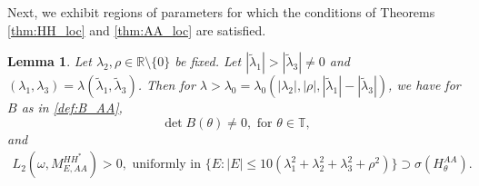 \documentclass[11pt]{amsart}
\newtheorem{lemma}[theorem]{Lemma}
\newcommand{\R}{\mathbb R}
\newcommand{\T}{\mathbb T}
\begin{document}
Next, we exhibit regions of parameters for which the conditions of Theorems \ref{thm:HH_loc} and \ref{thm:AA_loc} are satisfied.
\begin{lemma}\label{lem:AA_positive}
    Let $\lambda_2,\rho\in \R\setminus\{0\}$ be fixed. Let $|\tilde{\lambda}_1|>|\tilde{\lambda}_3|\neq 0$ and $(\lambda_1,\lambda_3)=\lambda(\tilde{\lambda}_1,\tilde{\lambda}_3)$. Then for $\lambda>\lambda_0=\lambda_0(|\lambda_2|,|\rho|,|\tilde{\lambda}_1|-|\tilde{\lambda}_3|)$, we have for $B$ as in \eqref{def:B_AA},
    \[\det B(\theta)\neq 0, \text{ for } \theta\in \T,\]
    and
    \begin{align}\label{eq:L_2>0_AA}
        L_2(\omega,M_{E,AA}^{HH^*})>0, \text{ uniformly in } \{E: |E|\leq 10(\lambda_1^2+\lambda_2^2+\lambda_3^2+\rho^2)\}\supset\sigma(H^{AA}_{\theta}).
    \end{align}
\end{lemma}
\end{document}
